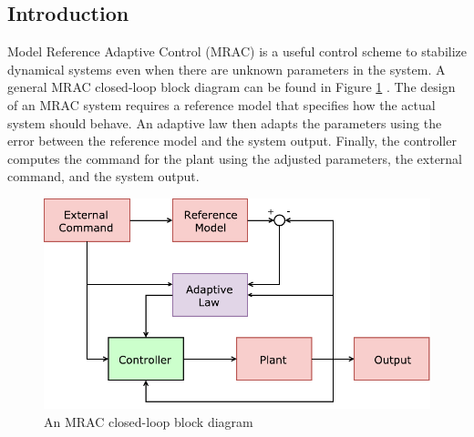 \subsection{Introduction}
Model Reference Adaptive Control (MRAC) is a useful control scheme to stabilize dynamical systems even when there are unknown parameters in the system. A general MRAC closed-loop block diagram can be found in Figure \ref{MRAC_blockdiagram} \cite{Lavretsky2013}. The design of an MRAC system requires a reference model that specifies how the actual system should behave. An adaptive law then adapts the parameters using the error between the reference model and the system output. Finally, the controller computes the command for the plant using the adjusted parameters, the external command, and the system output. 
\begin{figure}[htbp]
	\centering
	\includegraphics[width = 5in]{images/chapter2/MRAC.pdf}
	\caption{An MRAC closed-loop block diagram}
	\label{MRAC_blockdiagram}
\end{figure}

